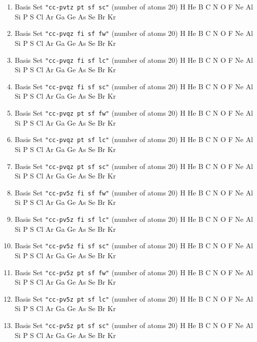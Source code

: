 \begin{enumerate}
\item Basis Set \verb#"cc-pvtz pt sf sc"# (number of atoms 20)  \newline 
  H He B C N O F Ne Al Si P S Cl Ar Ga Ge As Se Br Kr


\item Basis Set \verb#"cc-pvqz fi sf fw"# (number of atoms 20)  \newline 
  H He B C N O F Ne Al Si P S Cl Ar Ga Ge As Se Br Kr


\item Basis Set \verb#"cc-pvqz fi sf lc"# (number of atoms 20)  \newline 
  H He B C N O F Ne Al Si P S Cl Ar Ga Ge As Se Br Kr


\item Basis Set \verb#"cc-pvqz fi sf sc"# (number of atoms 20)  \newline 
  H He B C N O F Ne Al Si P S Cl Ar Ga Ge As Se Br Kr


\item Basis Set \verb#"cc-pvqz pt sf fw"# (number of atoms 20)  \newline 
  H He B C N O F Ne Al Si P S Cl Ar Ga Ge As Se Br Kr


\item Basis Set \verb#"cc-pvqz pt sf lc"# (number of atoms 20)  \newline 
  H He B C N O F Ne Al Si P S Cl Ar Ga Ge As Se Br Kr


\item Basis Set \verb#"cc-pvqz pt sf sc"# (number of atoms 20)  \newline 
  H He B C N O F Ne Al Si P S Cl Ar Ga Ge As Se Br Kr


\item Basis Set \verb#"cc-pv5z fi sf fw"# (number of atoms 20)  \newline 
  H He B C N O F Ne Al Si P S Cl Ar Ga Ge As Se Br Kr


\item Basis Set \verb#"cc-pv5z fi sf lc"# (number of atoms 20)  \newline 
  H He B C N O F Ne Al Si P S Cl Ar Ga Ge As Se Br Kr


\item Basis Set \verb#"cc-pv5z fi sf sc"# (number of atoms 20)  \newline 
  H He B C N O F Ne Al Si P S Cl Ar Ga Ge As Se Br Kr


\item Basis Set \verb#"cc-pv5z pt sf fw"# (number of atoms 20)  \newline 
  H He B C N O F Ne Al Si P S Cl Ar Ga Ge As Se Br Kr


\item Basis Set \verb#"cc-pv5z pt sf lc"# (number of atoms 20)  \newline 
  H He B C N O F Ne Al Si P S Cl Ar Ga Ge As Se Br Kr


\item Basis Set \verb#"cc-pv5z pt sf sc"# (number of atoms 20)  \newline 
  H He B C N O F Ne Al Si P S Cl Ar Ga Ge As Se Br Kr


\end{enumerate}


